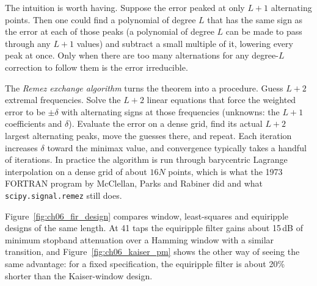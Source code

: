 
\begin{deeper}
The intuition is worth having. Suppose the error peaked at only $L+1$ alternating points. Then one
could find a polynomial of degree $L$ that has the same sign as the error at each of those peaks
(a polynomial of degree $L$ can be made to pass through any $L+1$ values) and subtract a small
multiple of it, lowering every peak at once. Only when there are too many alternations for any
degree-$L$ correction to follow them is the error irreducible.

The \emph{Remez exchange algorithm} turns the theorem into a procedure. Guess $L+2$ extremal
frequencies. Solve the $L+2$ linear equations that force the weighted error to be $\pm\delta$ with
alternating signs at those frequencies (unknowns: the $L+1$ coefficients and $\delta$). Evaluate
the error on a dense grid, find its actual $L+2$ largest alternating peaks, move the guesses
there, and repeat. Each iteration increases $\delta$ toward the minimax value, and convergence
typically takes a handful of iterations. In practice the algorithm is run through barycentric
Lagrange interpolation on a dense grid of about $16N$ points, which is what the 1973 FORTRAN
program by McClellan, Parks and Rabiner did and what \texttt{scipy.signal.remez} still does.
\end{deeper}

Figure~\ref{fig:ch06_fir_design} compares window, least-squares and equiripple designs of the
same length. At 41 taps the equiripple filter gains about 15\,dB of minimum stopband attenuation
over a Hamming window with a similar transition, and Figure~\ref{fig:ch06_kaiser_pm} shows the
other way of seeing the same advantage: for a fixed specification, the equiripple filter is
about 20\% shorter than the Kaiser-window design.


